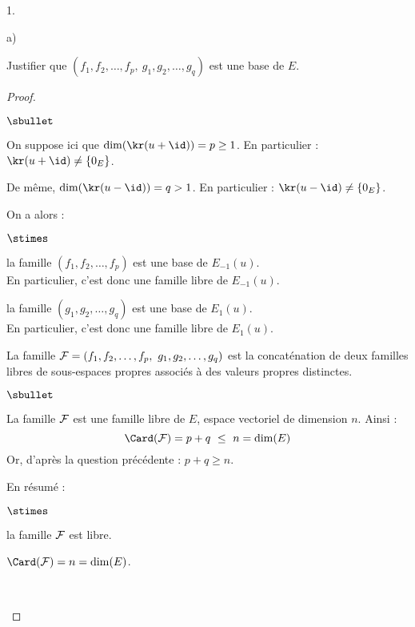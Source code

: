 \documentclass[11pt]{article}%
\begin{document}
\begin{noliste}{1.}
\begin{noliste}{a)}
  \item Justifier que $(f_1, f_2, \hdots, f_p, \ g_1,g_2,\hdots,g_q)$
    est une base de $E$.
    
    \begin{proof}~%
      \begin{noliste}{$\sbullet$}
      \item On suppose ici que $\dim(\kr(u + \id)) = p \geq 1$. En
        particulier : $\kr(u + \id) \neq \{ 0_E \}$.%

      \item De même, $\dim(\kr(u - \id)) = q > 1$. En particulier :
        $\kr(u - \id) \neq \{ 0_E \}$.%



        
      \item On a alors :
        \begin{noliste}{$\stimes$}
        \item la famille $(f_1, f_2, \ldots, f_p)$ est une base de
          $E_{-1}(u)$.\\
          En particulier, c'est donc une famille libre de $E_{-1}(u)$.
        \item la famille $(g_1, g_2, \ldots, g_q)$ est une base de
          $E_{1}(u)$.\\
          En particulier, c'est donc une famille libre de $E_{1}(u)$.
        \end{noliste}
        La famille ${\cal F} = (f_1, f_2, \ldots, f_p, \ g_1, g_2,
        \ldots, g_q)$ est la concaténation de deux familles libres de
        sous-espaces propres associés à des valeurs propres
        distinctes.%
      \end{noliste}
      




    \begin{noliste}{$\sbullet$}
    \item La famille ${\cal F}$ est une famille libre de $E$, espace
      vectoriel de dimension $n$. Ainsi :
      \[
      \Card({\cal F}) = p+q \ \leq \ n = \dim(E)
      \]
      Or, d'après la question précédente : $p+q \geq n$.%
      
    \item En résumé :
      \begin{noliste}{$\stimes$}
      \item la famille ${\cal F}$ est libre.
      \item $\Card({\cal F}) = n = \dim(E)$.
      \end{noliste}
      ~\\[-1.6cm]
    \end{noliste}    
    \end{proof}
  

\end{noliste}
\end{noliste}
\end{document}
